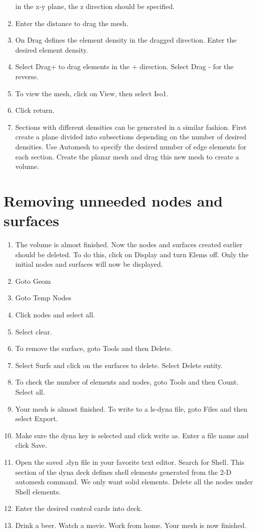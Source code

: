 \documentclass[12pt]{article}
\begin{document}
\begin{enumerate}
in the x-y plane, the z direction should be specified. 
\item Enter the distance to drag the mesh.
\item On Drag defines the element density in the dragged direction. Enter the desired element
density.
\item Select Drag+ to drag elements in the + direction. Select Drag - for the reverse.
\item To view the mesh, click on View, then select Iso1.
\item Click return.
\item Sections with different densities can be generated in a similar fashion. First create a plane
divided into subsections depending on the number of desired densities. Use Automesh to specify the desired
number of edge elements for each section. Create the planar mesh and drag this new mesh to create a volume. 
\end{enumerate}

\section*{Removing unneeded nodes and surfaces}
\vspace*{10Pt}
\noindent
\begin{enumerate}
\item The volume is almost finished. Now the nodes and surfaces created earlier should be
deleted. To do this, click on Display and turn Elems off. Only the initial nodes and surfaces
will now be displayed.
\item Goto Geom
\item Goto Temp Nodes
\item Click nodes and select all.
\item Select clear.
\item To remove the surface, goto Tools and then Delete.
\item Select Surfs and click on the surfaces to delete. Select Delete entity.
\item To check the number of elements and nodes, goto Tools and then Count. Select all.
\item Your mesh is almost finished. To write to a ls-dyna file, goto Files and then select Export.
\item Make sure the dyna key is selected and click write as. Enter a file name and click Save.
\item Open the saved .dyn file in your favorite text editor. Search for Shell. This section of the dyna
deck defines shell elements generated from the 2-D automesh command. We only want solid elements.
Delete all the nodes under Shell elements.
\item Enter the desired control cards into deck.
\item Drink a beer. Watch a movie. Work from home. Your mesh is now finished.
\end{enumerate}
\end{document}

